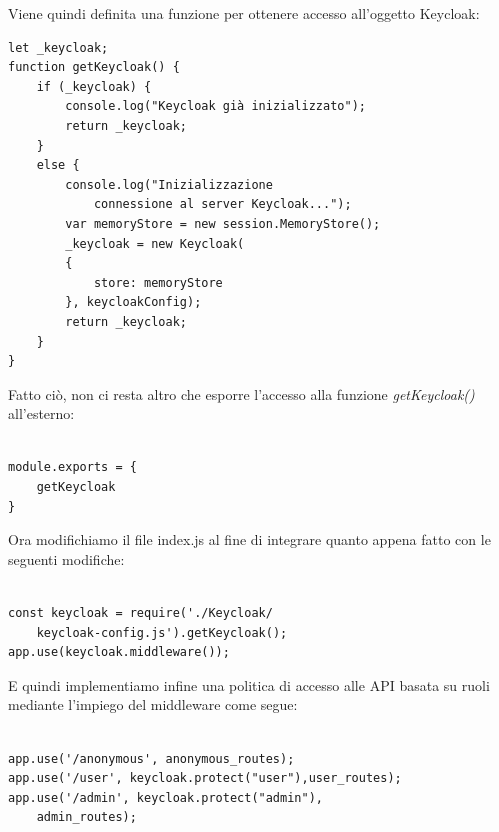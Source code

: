 \documentclass[twoside]{report}
\begin{document}
Viene quindi definita una funzione per ottenere accesso all'oggetto Keycloak:

\begin{listing}[h!]
\begin{verbatim}
let _keycloak;
function getKeycloak() {
    if (_keycloak) {
        console.log("Keycloak già inizializzato");
        return _keycloak;
    } 
    else {
        console.log("Inizializzazione 
            connessione al server Keycloak...");
        var memoryStore = new session.MemoryStore();
        _keycloak = new Keycloak(
        { 
            store: memoryStore
        }, keycloakConfig);
        return _keycloak;
    }
}

\end{verbatim}
\end{listing}
\FloatBarrier

Fatto ciò, non ci resta altro che esporre l'accesso alla funzione \textit{getKeycloak()} all'esterno:

\begin{listing}[h!]
\begin{verbatim}

module.exports = {
    getKeycloak
}

\end{verbatim}
\end{listing}
\FloatBarrier

Ora modifichiamo il file index.js al fine di integrare quanto appena fatto con le seguenti modifiche:

\begin{listing}[h!]
\begin{verbatim}

const keycloak = require('./Keycloak/
    keycloak-config.js').getKeycloak();
app.use(keycloak.middleware());
\end{verbatim}
\end{listing}
\FloatBarrier

E quindi implementiamo infine una politica di accesso alle API basata su ruoli mediante l'impiego del middleware come segue:

\begin{listing}[h!]
\begin{verbatim}

app.use('/anonymous', anonymous_routes);
app.use('/user', keycloak.protect("user"),user_routes);
app.use('/admin', keycloak.protect("admin"),
    admin_routes);

\end{verbatim}
\end{listing}
\FloatBarrier
\graphicspath{ {../progetto/images/mongodb/} }
\end{document}
